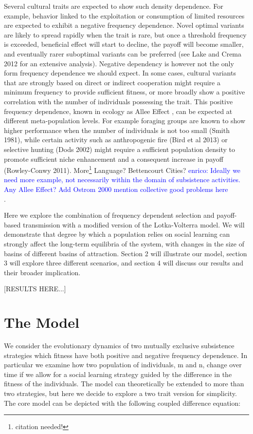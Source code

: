 \documentclass[preprint,authoryear]{elsarticle}
\newcommand{\memo}[2]{\textcolor{#1}{#2}}
\newcommand{\enrico}[1]{\memo{blue}{enrico: #1\\}}
\begin{document}
Several cultural traits are expected to show such density dependence. For example, behavior linked to the exploitation or consumption of limited resources are expected to exhibit a negative frequency dependence.  Novel optimal variants are likely to spread rapidly when the trait is rare, but once a threshold frequency is exceeded,  beneficial effect will start to decline,  the payoff will become smaller,  and eventually rarer suboptimal variants can be preferred (see Lake and Crema 2012 for an extensive analysis).  Negative dependency is however not the only form frequency dependence we should expect. In some cases, cultural variants that are strongly based on direct or indirect cooperation might require a minimum frequency to provide sufficient fitness, or more broadly show a positive correlation with the number of individuals possessing the trait. This positive frequency dependence, known in ecology as Allee Effect \citep{allee1958}, can be expected at different meta-population levels.  For example foraging groups are known to show higher performance when the number of individuals is not too small (Smith 1981), while certain activity such as anthropogenic fire (Bird et al 2013) or selective hunting (Dods 2002) might require a sufficient population density to promote sufficient niche enhancement and a consequent increase in payoff (Rowley-Conwy 2011). More\footnote{citation needed!} Language? Bettencourt Cities? \enrico{Ideally we need more example, not necessarily within the domain of subsistence activities. Any Allee Effect? Add Ostrom 2000 mention collective good problems here}.

Here we explore the combination of frequency dependent selection and payoff-based transmission with a modified version of the Lotka-Volterra model. We will demonstrate that degree by which a population relies on social learning can strongly affect the long-term equilibria of the system, with changes in the size of basins of different basins of attraction. Section 2 will illustrate our model, section 3 will explore three different scenarios, and section 4 will discuss our results and their broader implication. 

[RESULTS HERE...]

\section{The Model}
We consider the evolutionary dynamics of two mutually exclusive subsistence strategies which fitness have both positive and negative frequency dependence. In particular we examine how two population of individuals, m and n, change over time if we allow for a social learning strategy guided by the difference in the fitness of the individuals. The model can theoretically be extended to more than two strategies, but here we decide to explore a two trait version for simplicity. The core model can be depicted with the following coupled difference equation:
\end{document}
